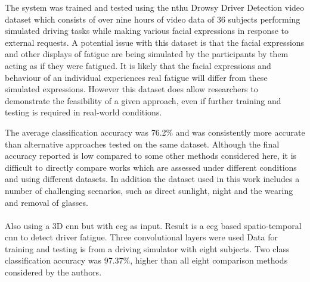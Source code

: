 \documentclass[11pt, parskip=half*,twoside=false]{scrbook}
\begin{document}
The system was trained and tested using the \gls{nthu} Drowsy Driver Detection video dataset \citep{wengDriverDrowsinessDetection2017} which consists of over nine hours of video data of 36 subjects performing simulated driving tasks while making various facial expressions in response to external requests. A potential issue with this dataset is that the facial expressions and other displays of fatigue are being simulated by the participants by them acting as if they were fatigued. It is likely that the facial expressions and behaviour of an individual experiences real fatigue will differ from these simulated expressions. However this dataset does allow researchers to demonstrate the feasibility of a given approach, even if further training and testing is required in real-world conditions.

The average classification accuracy was 76.2\% and was consistently more accurate than alternative approaches tested on the same dataset. Although the final accuracy reported is low compared to some other methods considered here, it is difficult to directly compare works which are assessed under different conditions and using different datasets. In addition the dataset used in this work includes a number of challenging scenarios, such as direct sunlight, night and the wearing and removal of glasses.

\paragraph{\citet{trutschelPERCLOSAlertnessMeasure2011}}

\paragraph{\citet{gaoEEGBasedSpatioTemporal2019}} Also using a 3D \gls{cnn} but with \gls{eeg} as input. Result is a \gls{eeg} based spatio-temporal \gls{cnn} to detect driver fatigue. Three convolutional layers were used Data for training and testing is from a driving simulator with eight subjects. Two class classification accuracy was 97.37\%, higher than all eight comparison methods considered by the authors.
\end{document}
